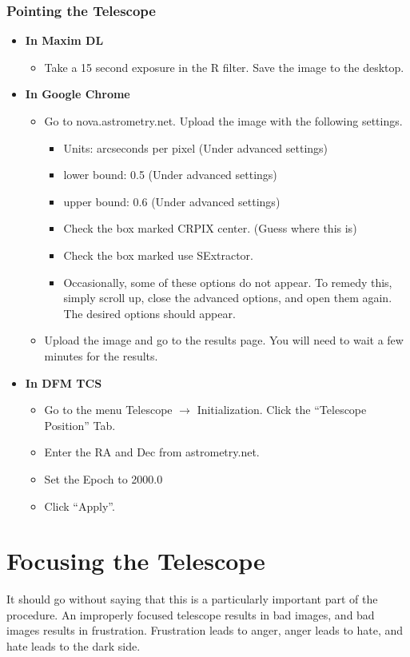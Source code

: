 \documentclass[letterpaper, 12pt]{report}
\begin{document}
\subsection{Pointing the Telescope}
\begin{itemize}
	\item \large \textbf{In Maxim DL}
	\begin{itemize}
		\item Take a 15 second exposure in the R filter. Save the image to the desktop.
	\end{itemize}
	\item \large \textbf{In Google Chrome}
	\begin{itemize}
		\item Go to nova.astrometry.net. Upload the image with the following settings.
		\begin{itemize}
			\item Units: arcseconds per pixel (Under advanced settings)
			\item lower bound: 0.5 (Under advanced settings)
			\item upper bound: 0.6 (Under advanced settings)
			\item Check the box marked CRPIX center. (Guess where this is)
			\item Check the box marked use SExtractor.
			\item Occasionally, some of these options do not appear. To remedy this, simply scroll up, close the advanced options, and open them again. The desired options should appear.
		\end{itemize}
		\item Upload the image and go to the results page. You will need to wait a few minutes for the results.
	\end{itemize}
	\newpage
	\item \large \textbf{In DFM TCS}
	\begin{itemize}
		\item Go to the menu Telescope $\rightarrow$ Initialization. Click the ``Telescope Position'' Tab.
		\item Enter the RA and Dec from astrometry.net.
		\item Set the Epoch to 2000.0
		\item Click ``Apply''.
	\end{itemize}
\end{itemize}

\newpage

\chapter{Focusing the Telescope}
\label{ch:focusing}
It should go without saying that this is a particularly important part of the procedure. An improperly focused telescope results in bad images, and bad images results in frustration. Frustration leads to anger, anger leads to hate, and hate leads to the dark side.
\end{document}

